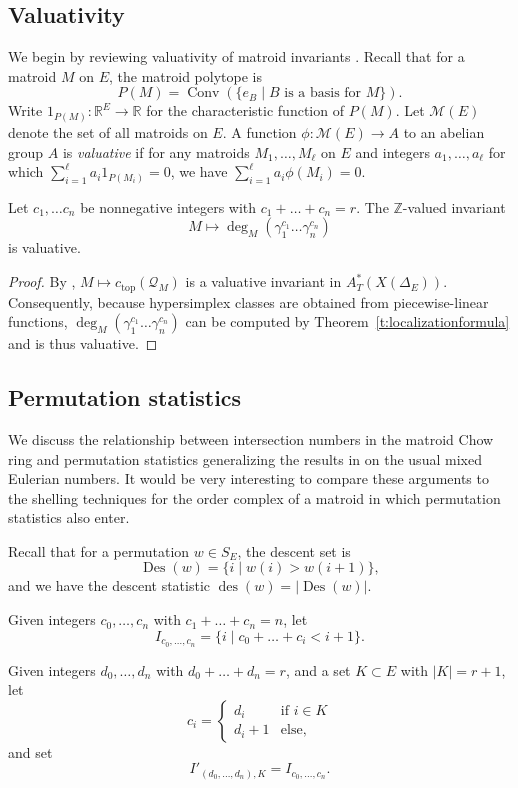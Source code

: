 \documentclass[ALCO,published]{cedram}
\numberwithin{equation}{section}
\numberwithin{figure}{section}
\newcommand{\R}{\mathbb{R}}
\newcommand{\Z}{\mathbb{Z}}
\DeclareMathOperator{\Des}{Des}
\DeclareMathOperator{\des}{des}
\DeclareMathOperator{\topp}{top}
\begin{document}
\subsection{Valuativity} \label{ss:valuativity}


We begin by reviewing valuativity of matroid invariants \cite{DerksenFink:valuative}. Recall that for a matroid $M$ on $E$, the matroid polytope is 
\[P(M)=\operatorname{Conv}(\{e_B\mid B\text{ is a basis for }M\}).\]
Write $1_{P(M)}\colon \R^{E}\to \R$ for the characteristic function of $P(M)$. Let $\mathcal{M}(E)$ denote the set of all matroids on $E$. A function $\phi\colon \mathcal{M}(E)\to A$ to an abelian group $A$ is {\em valuative} if for any matroids $M_1,\dots,M_{\ell}$ on $E$ and integers $a_1,\dots,a_{\ell}$ for which $\sum_{i=1}^{\ell} a_i1_{P(M_i)}=0$, we have $\sum_{i=1}^{\ell} a_i\phi(M_i)=0$.

\begin{theorem} Let $c_1,\dots c_n$ be nonnegative integers with $c_1+\dots+c_n=r$. 
    The $\Z$-valued invariant 
    \[M\mapsto \deg_M(\gamma_1^{c_1}\dots\gamma_n^{c_n})\]
    is valuative.
\end{theorem}

\begin{proof}
By \cite[Proposition~5.6]{BEST}, $M\mapsto c_{\topp}(\mathcal{Q}_{M})$ is a valuative invariant in $A^*_T(X(\Delta_{E}))$. Consequently, because hypersimplex classes are obtained from piecewise-linear functions, $\deg_M(\gamma_1^{c_1}\dots\gamma_n^{c_n})$ can be computed by  Theorem~\ref{t:localizationformula} and is thus valuative.
\end{proof}

\subsection{Permutation statistics}
We discuss the relationship between intersection numbers in the matroid Chow ring and permutation statistics generalizing the results in \cite[Section~3]{Postnikov:permutohedra} on the usual mixed Eulerian numbers. It would be very interesting to compare these arguments to the shelling techniques for the order complex of a matroid \cite[Section~7.6]{Bjorner:shellability} in which permutation statistics also enter.

Recall that for a permutation $w\in S_{E}$,
the descent set is 
\[\Des(w)=\{i\mid w(i)>w(i+1)\},
\]
and we have the descent statistic $\des(w)=|\Des(w)|$.

\begin{defi} \label{d:descentset}
Given  integers $c_0,\dots,c_{n}$ with $c_1+\dots+c_{n}=n$, let
\[I_{c_0,\dots,c_n}=\{i\mid c_0+\dots+c_i<i+1\}.\]

Given integers $d_0,\dots,d_{n}$ with $d_0+\dots+d_n=r$, and a set $K\subset E$ with $|K|=r+1$, let 
\[c_i=\begin{cases}
d_i &\text{if }i\in K\\
d_i+1 &\text{else}, 
\end{cases}\]
and set 
\[I'_{(d_0,\dots,d_n),K}=I_{c_0,\dots,c_n}.\]
\end{defi}
\end{document}
